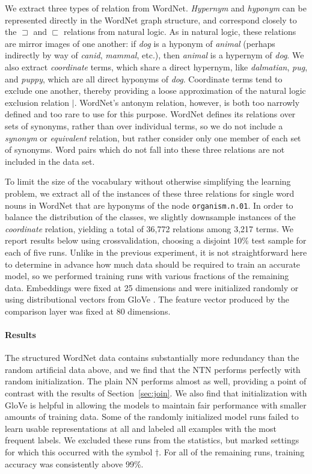 \documentclass[letterpaper]{article}
\newcommand{\natfor}{\sqsubset}
\newcommand{\natrev}{\sqsupset}
\newcommand{\natalt}{\mathbin{|}}
\def\ii#1{\textit{#1}}
\begin{document}
We extract three types of relation from WordNet. \ii{Hypernym} and
\ii{hyponym} can be represented directly in the WordNet graph
structure, and correspond closely to the $\natrev$ and $\natfor$
relations from natural logic. As in natural logic, these relations are
mirror images of one another: if \ii{dog} is a hyponym of \ii{animal}
(perhaps indirectly by way of \ii{canid}, \ii{mammal}, etc.), then
\ii{animal} is a hypernym of \ii{dog}. We also extract \ii{coordinate}
terms, which share a direct hypernym, like \ii{dalmatian}, \ii{pug},
and \ii{puppy}, which are all direct hyponyms of \ii{dog}.  Coordinate
terms tend to exclude one another, thereby providing a loose approximation 
of the natural logic exclusion relation $\natalt$. WordNet's antonym relation, however, is both too narrowly defined
and too rare to use for this purpose. WordNet defines its relations over
sets of synonyms, rather than over individual terms, so we do not
include a \ii{synonym} or \ii{equivalent} relation, but rather
consider only one member of each set of synonyms. Word pairs which do
not fall into these three relations are not included in the data set.

To limit the size of the vocabulary without otherwise simplifying the learning problem, we extract all of the
instances of these three relations for single word nouns in WordNet that are hyponyms of the node 
\texttt{organism.n.01}. In order to balance the distribution of the classes, we slightly downsample instances 
of the \ii{coordinate} relation, yielding a total of 36,772 relations among 3,217 terms. We report results below using crossvalidation, choosing a disjoint 10\% test sample for each of five runs. Unlike in the previous experiment,
it is not straightforward here to determine in advance
how much data should be required to train an accurate model, so we performed training runs with 
various fractions of the remaining data. Embeddings were fixed at 25 dimensions and were initialized 
randomly or using distributional vectors from GloVe \cite{pennington2014glove}. The feature vector 
produced by the comparison layer was fixed at 80 dimensions.

\paragraph{Results} 
The structured WordNet data contains substantially more redundancy than the random artificial data above, and we find that the NTN performs perfectly with random initialization. The plain NN performs almost as well, providing
a point of contrast with the results of Section~\ref{sec:join}. We also find that initialization with GloVe is helpful in allowing the models to maintain fair performance
with smaller amounts of training data. Some of the randomly initialized model runs failed to learn
usable representations at all and labeled all examples with the most frequent labels. We excluded these runs from the statistics, but marked settings for which this occurred with the symbol $\dagger$. For all of the remaining runs, training accuracy was consistently above 99\%.
\end{document}
